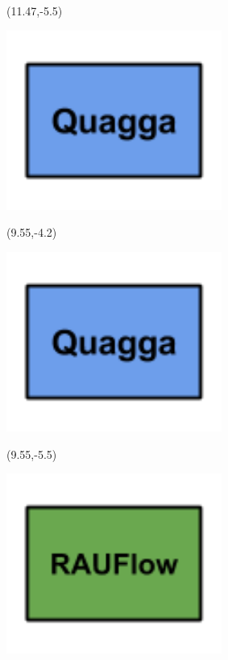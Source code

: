 \documentclass{beamer}
\begin{document}
\begin{frame}
\begin{textblock}{3}(11.47,-5.5)
\begin{minipage}{\textwidth}
\setlength{\parindent}{0pt}
\setlength{\parskip}{0.1cm}
\includegraphics[width=0.53\textwidth, right]{imagenes/buildingblockquagga.png}
\end{minipage}
\end{textblock}

\begin{textblock}{3}(9.55,-4.2)
\begin{minipage}{\textwidth}
\setlength{\parindent}{0pt}
\setlength{\parskip}{0.1cm}
\includegraphics[width=0.53\textwidth, right]{imagenes/buildingblockquagga.png}
\end{minipage}
\end{textblock}

\pause

\begin{textblock}{3}(9.55,-5.5)
\begin{minipage}{\textwidth}
\setlength{\parindent}{0pt}
\setlength{\parskip}{0.1cm}
\includegraphics[width=0.53\textwidth, right]{imagenes/buldingblockrauflow.png}
\end{minipage}
\end{textblock}


\end{frame}
\end{document}
